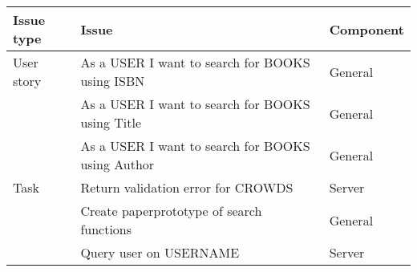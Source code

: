 \begin{longtable}{|L{2cm}|L{10cm}|L{3cm}|}
\hline
\textbf{Issue type} & \textbf{Issue} & \textbf{Component} \\
\hline
User story & As a USER I want to search for BOOKS using ISBN & General \\
\hline
 & As a USER I want to search for BOOKS using Title & General \\
 \hline
 & As a USER I want to search for BOOKS using Author & General \\
 \hline
Task & Return validation error for CROWDS & Server \\
\hline
 & Create paperprototype of search functions & General \\
 \hline
 & Query user on USERNAME & Server \\


\end{longtable}
